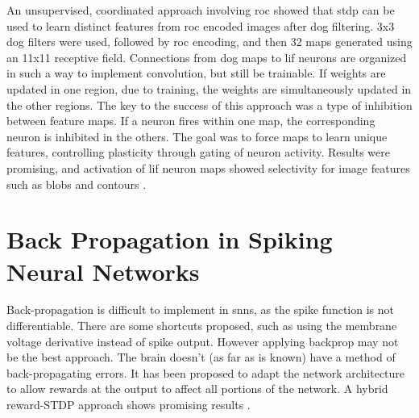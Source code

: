     An unsupervised, coordinated approach involving \gls{roc} showed that
    \gls{stdp} can be used to learn distinct features from \gls{roc} encoded
    images after \gls{dog} filtering. 3x3 \gls{dog} filters were used, followed
    by \gls{roc} encoding, and then 32 maps generated using an 11x11 receptive
    field. Connections from \gls{dog} maps to \gls{lif} neurons are organized in
    such a way to implement convolution, but still be trainable. If weights are
    updated in one region, due to training, the weights are simultaneously
    updated in the other regions. The key to the success of this approach was a
    type of inhibition between feature maps. If a neuron fires within one map,
    the corresponding neuron is inhibited in the others. The goal was to force
    maps to learn unique features, controlling plasticity through gating of
    neuron activity. Results were promising, and activation of \gls{lif} neuron
    maps showed selectivity for image features such as blobs and contours
    \parencite{delorme_2001}.
    
    \section{Back Propagation in Spiking Neural Networks}
    
    Back-propagation is difficult to implement in \glspl{snn}, as the
    spike function is not differentiable. There are some shortcuts proposed,
    such as using the membrane voltage derivative instead of spike
    output. However applying backprop may not be the best approach. The brain
    doesn't (as far as is known) have a method of back-propagating errors. It
    has been proposed to adapt the network architecture to allow rewards at the
    output to affect all portions of the network. A hybrid reward-STDP approach
    shows promising results \parencite{tavanaei_2019}.
    
    
